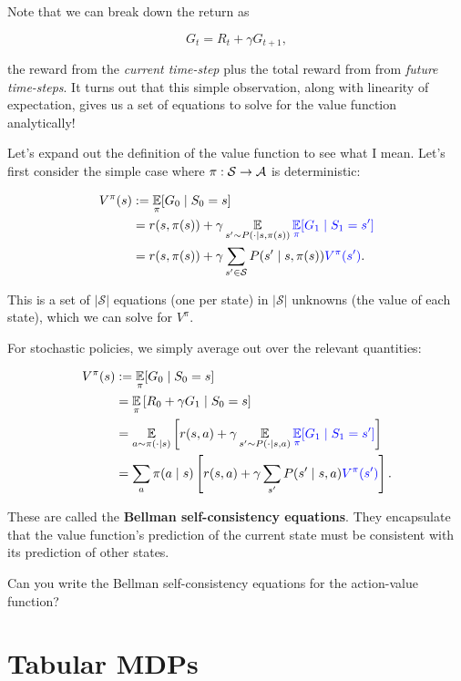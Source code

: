 \documentclass[../main/main]{subfiles}
\begin{document}
Note that we can break down the return as

\[
    G_t = R_t + \gamma G_{t+1},
\]

the reward from the \emph{current time-step} plus the total reward from from \emph{future time-steps}. It turns out that this simple observation, along with linearity of expectation, gives us a set of equations to solve for the value function analytically!

Let's expand out the definition of the value function to see what I mean. Let's first consider the simple case where $\pi : \mathcal{S} \to \mathcal{A}$ is deterministic:

\begin{align*}
    V^\pi(s) &:= \operatorname*{\mathbb{E}}_\pi[G_0 \mid S_0 = s] \\
    &= r(s, \pi(s)) + \gamma \operatorname*{\mathbb{E}}_{s' \sim P(\cdot \mid s, \pi(s))} {\color{blue} \operatorname*{\mathbb{E}}_\pi [G_1 \mid S_1 = s']} \\
    &= r(s, \pi(s)) + \gamma \sum_{s' \in \mathcal{S}} P(s' \mid s, \pi(s)) {\color{blue} V^\pi(s')}.
\end{align*}

This is a set of $|\mathcal{S}|$ equations (one per state) in $|\mathcal{S}|$ unknowns (the value of each state), which we can solve for $V^\pi$.

For stochastic policies, we simply average out over the relevant quantities:

\begin{align*}
    V^\pi(s) &:= \operatorname*{\mathbb{E}}_\pi [G_0 \mid S_0 = s] \\
    &= \operatorname*{\mathbb{E}}_\pi \left[ R_0 + \gamma G_1 \mid S_0 = s \right] \\
    &= \operatorname*{\mathbb{E}}_{a \sim \pi(\cdot \mid s)} \left[ r(s, a) + \gamma \operatorname*{\mathbb{E}}_{s' \sim P(\cdot \mid s, a)}  {\color{blue} \operatorname*{\mathbb{E}}_\pi [G_1 \mid S_1 = s']} \right] \\
    &= \sum_a \pi(a \mid s) \left[r(s, a) + \gamma \sum_{s'} P(s' \mid s, a) {\color{blue} V^\pi(s')} \right].
\end{align*}

These are called the \textbf{Bellman self-consistency equations}. They encapsulate that the value function's prediction of the current state must be consistent with its prediction of other states.

Can you write the Bellman self-consistency equations for the action-value function?


\section{Tabular MDPs}
\end{document}
